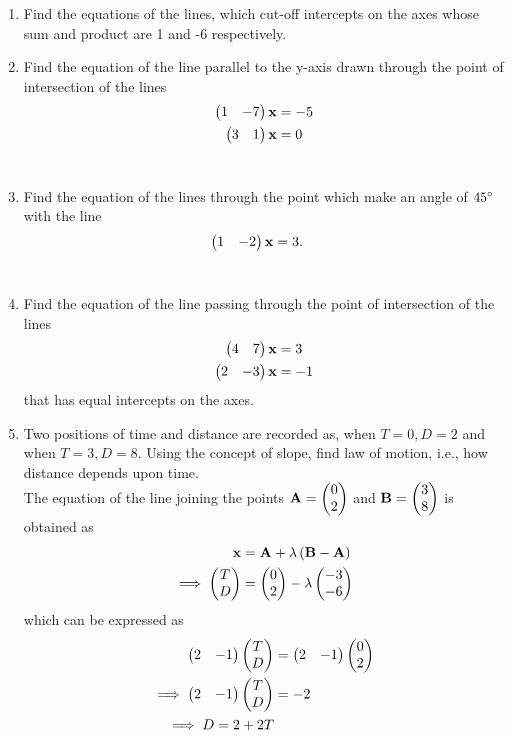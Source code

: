 \documentclass[journal,12pt,twocolumn]{IEEEtran}
\renewcommand\thesection{\arabic{section}}
\begin{document}
\begin{enumerate}[label=\thesection.\arabic*.,ref=\thesection.\theenumi]
\item Find the equations of the lines, which cut-off intercepts on the axes whose sum and product are 1 and -6 respectively.
%
\\
\solution
%
\item Find the equation of the line parallel to the y-axis drawn through the point of intersection of the lines 
%
\begin{align}
\begin{pmatrix}1 & -7\end{pmatrix}\mathbf{x} &= -5
\\
\begin{pmatrix}3 & 1\end{pmatrix}\mathbf{x} &= 0
\end{align}
%
\\
\solution
%
%
\item Find the equation of the lines through the point  which make an angle of $45\degree$ with the line 
\begin{align}
\begin{pmatrix}1 & -2\end{pmatrix}\mathbf{x} &= 3.
\end{align}
\\
\solution
%
%
\item Find the equation of the line passing through the point of intersection of the lines 
%
\begin{align}
\begin{pmatrix}4 & 7\end{pmatrix}\mathbf{x} &= 3
\\
\begin{pmatrix}2 & -3\end{pmatrix}\mathbf{x} &= -1
\end{align}
%
that has equal intercepts on the axes.
\\
\solution
%
\item Two positions of time and distance are recorded as, when $T = 0, D = 2$ and when $T = 3, D = 8$. Using the concept of slope, find law of motion, i.e., how distance depends upon time.
%
\\
\solution The equation of the line joining the points $\mathbf{A}=\begin{pmatrix}0\\2\end{pmatrix}$ and $\mathbf{B}=\begin{pmatrix}3\\8\end{pmatrix}$ is obtained as
%
\begin{align}
\label{eq:line_two_pt}
\mathbf{x} &= \mathbf{A}+\lambda\left(\mathbf{B}-\mathbf{A}\right)
\\
\implies \begin{pmatrix}T\\D\end{pmatrix} &= \begin{pmatrix}0\\2\end{pmatrix}-\lambda\begin{pmatrix}-3\\-6\end{pmatrix}
\end{align}
%
which can be expressed as
\begin{align}
\begin{pmatrix}2 & -1\end{pmatrix}\begin{pmatrix}T\\D\end{pmatrix} &= \begin{pmatrix}2 & -1\end{pmatrix}\begin{pmatrix}0\\2\end{pmatrix}\\
\implies \begin{pmatrix}2 & -1\end{pmatrix}\begin{pmatrix}T\\D\end{pmatrix} &= -2
\\
\implies D = 2+2T
\end{align}


\end{enumerate}
\end{document}
